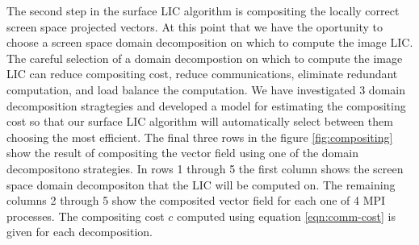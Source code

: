 \documentclass[a4paper,10pt]{article}
\begin{document}
The second step in the surface LIC algorithm is compositing the locally correct screen space projected vectors. At this point that we have the oportunity to choose a screen space domain decomposition on which to compute the image LIC. The careful selection of a domain decompostion on which to compute the image LIC can reduce compositing cost, reduce communications, eliminate redundant computation, and load balance the computation. We have investigated 3 domain decomposition stragtegies and developed a model for estimating the compositing cost so that our surface LIC algorithm will automatically select between them choosing the most efficient. The final three rows in the figure \ref{fig:compositing} show the result of compositing the vector field using one of the domain decompositono strategies. In rows 1 through 5 the first column shows the screen space domain decompositon that the LIC will be computed on. The remaining columns 2 through 5 show the composited vector field for each one of 4 MPI processes. The compositing cost $c$ computed using equation \ref{eqn:comm-cost} is given for each decomposition.
\end{document}
